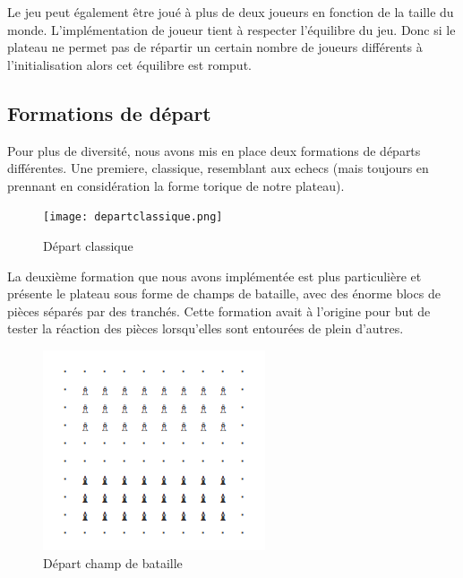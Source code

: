     Le jeu peut également être joué à plus de deux joueurs en fonction de la taille du monde. L'implémentation de joueur tient à respecter l'équilibre du jeu. Donc si le plateau ne permet pas de répartir un certain nombre de joueurs différents à l'initialisation alors cet équilibre est romput. 
    \subsection{Formations de départ}
            Pour plus de diversité, nous avons mis en place deux formations de départs différentes. Une premiere, classique, resemblant aux echecs (mais toujours en prennant en considération la forme torique de notre plateau). \\
            
            \begin{figure}[H]
                \centering
                \texttt{[image: departclassique.png]}
                \caption{Départ classique}
                \label{fig:depart_classique}
            \end{figure}

            La deuxième formation que nous avons implémentée est plus particulière et présente le plateau sous forme de champs de bataille, avec des énorme blocs de pièces séparés par des tranchés. Cette formation avait à l'origine pour but de tester la réaction des pièces lorsqu'elles sont entourées de plein d'autres. \\
            
            \begin{figure}[H]
                \centering
                \includegraphics[scale=0.6]{img/battleground.png}
                \caption{Départ champ de bataille}
                \label{fig:depart_champ_de_bataille}
            \end{figure}


